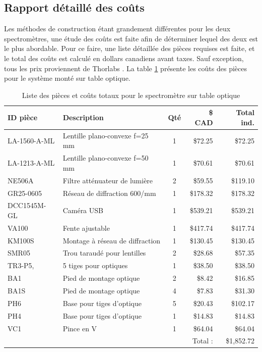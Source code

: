 \documentclass[11pt,letterpaper]{article}
\begin{document}


\subsection{Rapport détaillé des coûts}

Les méthodes de construction étant grandement différentes pour les deux spectromètres, une 
étude des coûts est faite afin de déterminer lequel des deux est le plus abordable. Pour ce
faire, une liste détaillée des pièces requises est faite, et le total des coûts est calculé en
dollars canadiens avant taxes. Sauf exception, tous les prix proviennent de Thorlabs \cite{noauthor_thorlabs_2024}. La table \ref{prix_table} présente les coûts des pièces pour
le système monté sur table optique.

\begin{table}[!ht]
    \centering
    \caption{Liste des pièces et coûts totaux pour le spectromètre sur table optique \cite{noauthor_thorlabs_2024}}
    \begin{tabular}{|l|l|c|r|r|}
    \hline
        ID pièce & Description & Qté & \$ CAD & Total ind. \\ \hline\hline
        LA-1560-A-ML & Lentille plano-convexe f=25 mm & 1 & \$72.25 & \$72.25 \\ \hline
        LA-1213-A-ML & Lentille plano-convexe f=50 mm & 1 & \$70.61 & \$70.61 \\ \hline
        NE506A & Filtre atténuateur de lumière & 2 & \$59.55 & \$119.10 \\ \hline
        GR25-0605 & Réseau de diffraction 600/mm & 1 & \$178.32 & \$178.32 \\ \hline
        DCC1545M-GL & Caméra USB & 1 & \$539.21 & \$539.21 \\ \hline
        VA100 & Fente ajustable & 1 & \$417.74 & \$417.74 \\ \hline
        KM100S & Montage à réseau de diffraction & 1 & \$130.45 & \$130.45 \\ \hline
        SMR05 & Trou taraudé pour lentilles & 2 & \$28.68 & \$57.35 \\ \hline
        TR3-P5, & 5 tiges pour optiques & 1 & \$38.50 & \$38.50 \\ \hline
        BA1 & Pied de montage optique & 2 & \$8.42 & \$16.85 \\ \hline
        BA1S & Pied de montage optique & 4 & \$7.83 & \$31.30 \\ \hline
        PH6 & Base pour tiges d'optique & 5 & \$20.43 & \$102.17 \\ \hline
        PH4 & Base pour tiges d'optique & 1 & \$14.83 & \$14.83 \\ \hline
        VC1 & Pince en V & 1 & \$64.04 & \$64.04 \\ \hline\hline
        ~ & ~ & ~ & Total : & \$1,852.72 \\ \hline
    \end{tabular}
    \label{prix_table}
\end{table}
\end{document}
